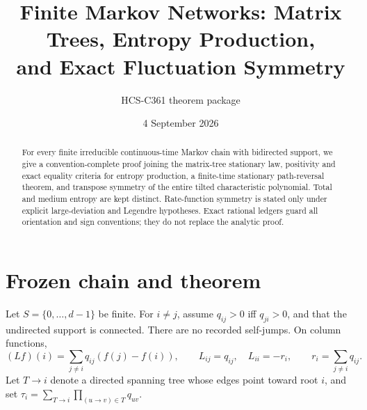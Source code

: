 \documentclass[10pt]{article}
\title{Finite Markov Networks: Matrix Trees, Entropy Production,\\and Exact Fluctuation Symmetry}
\author{HCS-C361 theorem package}
\date{4 September 2026}
\begin{document}
\maketitle
\begin{abstract}
For every finite irreducible continuous-time Markov chain with bidirected support, we give a convention-complete proof joining the matrix-tree stationary law, positivity and exact equality criteria for entropy production, a finite-time stationary path-reversal theorem, and transpose symmetry of the entire tilted characteristic polynomial.  Total and medium entropy are kept distinct.  Rate-function symmetry is stated only under explicit large-deviation and Legendre hypotheses.  Exact rational ledgers guard all orientation and sign conventions; they do not replace the analytic proof.
\end{abstract}

\section{Frozen chain and theorem}
Let $S=\{0,\ldots,d-1\}$ be finite.  For $i\ne j$, assume $q_{ij}>0$ iff $q_{ji}>0$, and that the undirected support is connected.  There are no recorded self-jumps.  On column functions,
\[
 (Lf)(i)=\sum_{j\ne i}q_{ij}(f(j)-f(i)),\qquad
 L_{ij}=q_{ij},\quad L_{ii}=-r_i,\qquad r_i=\sum_{j\ne i}q_{ij}.
\]
Let $T\to i$ denote a directed spanning tree whose edges point toward root $i$, and set
$\tau_i=\sum_{T\to i}\prod_{(u\to v)\in T}q_{uv}$.
\end{document}
